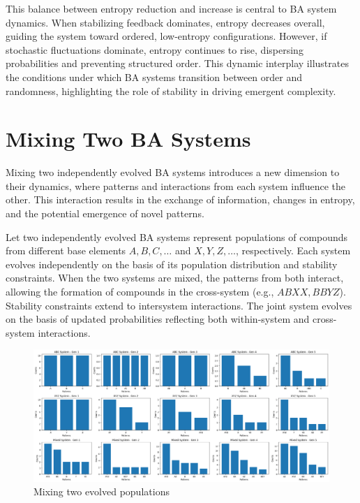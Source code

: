 \documentclass[entropy,article,submit,pdftex,moreauthors]{Definitions/mdpi}
\begin{document}
This balance between entropy reduction and increase is central to BA system dynamics. When stabilizing feedback dominates, entropy decreases overall, guiding the system toward ordered, low-entropy configurations. However, if stochastic fluctuations dominate, entropy continues to rise, dispersing probabilities and preventing structured order. This dynamic interplay illustrates the conditions under which BA systems transition between order and randomness, highlighting the role of stability in driving emergent complexity.



\section{Mixing Two BA Systems}

Mixing two independently evolved BA systems introduces a new dimension to their dynamics, where patterns and interactions from each system influence the other. This interaction results in the exchange of information, changes in entropy, and the potential emergence of novel patterns. 

Let two independently evolved BA systems represent populations of compounds from different base elements \( A, B, C, \dots \) and \( X, Y, Z, \dots \), respectively. Each system evolves independently on the basis of its population distribution and stability constraints. When the two systems are mixed, the patterns from both interact, allowing the formation of compounds in the cross-system (e.g., \( ABXX, BBYZ \)). Stability constraints extend to intersystem interactions. The joint system evolves on the basis of updated probabilities reflecting both within-system and cross-system interactions.

\begin{figure}[htp]
    \centering
    \includegraphics[width=13cm]{mixed_1}
    \caption{Mixing two evolved populations}
    \label{fig:mixed_1}
\end{figure}
\end{document}
